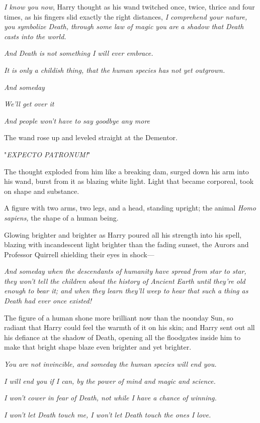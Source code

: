 \emph{I know you now}, Harry thought as his wand twitched once, twice, thrice
and four times, as his fingers slid exactly the right distances, \emph{I
comprehend your nature, you symbolize Death, through some law of magic you are
a shadow that Death casts into the world.}

\emph{And Death is not something I will ever embrace.}

\emph{It is only a childish thing, that the human species has not yet outgrown.}

\emph{And someday{\el}}

\emph{We'll get over it{\el}}

\emph{And people won't have to say goodbye any more{\el}}

The wand rose up and leveled straight at the Dementor.

"\emph{EXPECTO PATRONUM!}"

The thought exploded from him like a breaking dam, surged down his arm into his
wand, burst from it as blazing white light. Light that became corporeal, took
on shape and substance.

A figure with two arms, two legs, and a head, standing upright; the animal
\emph{Homo sapiens,} the shape of a human being.

Glowing brighter and brighter as Harry poured all his strength into his spell,
blazing with incandescent light brighter than the fading sunset, the Aurors and
Professor Quirrell shielding their eyes in shock—

\emph{And someday when the descendants of humanity have spread from star to
star, they won't tell the children about the history of Ancient Earth until
they're old enough to bear it; and when they learn they'll weep to hear that
such a thing as Death had ever once existed!}

The figure of a human shone more brilliant now than the noonday Sun, so radiant
that Harry could feel the warmth of it on his skin; and Harry sent out all his
defiance at the shadow of Death, opening all the floodgates inside him to make
that bright shape blaze even brighter and yet brighter.

\emph{You are not invincible, and someday the human species will end you.}

\emph{I will end you if I can, by the power of mind and magic and science.}

\emph{I won't cower in fear of Death, not while I have a chance of winning.}

\emph{I won't let Death touch me, I won't let Death touch the ones I love.}

